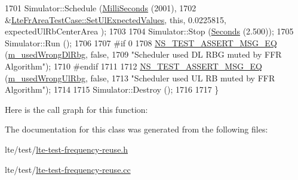 \begin{DoxyCode}
1701   Simulator::Schedule (\hyperlink{group__timecivil_gaf26127cf4571146b83a92ee18679c7a9}{MilliSeconds} (2001),
1702                        &\hyperlink{classLteFrAreaTestCase_aac2718dc3703d2ad389f88ffa20d035e}{LteFrAreaTestCase::SetUlExpectedValues}, \textcolor{keyword}{this},
       0.0225815, expectedUlRbCenterArea );
1703 
1704   Simulator::Stop (\hyperlink{group__timecivil_ga33c34b816f8ff6628e33d5c8e9713b9e}{Seconds} (2.500));
1705   Simulator::Run ();
1706 
1707 \textcolor{preprocessor}{#if 0}
1708   \hyperlink{group__testing_ga2a9d78cffb3db8e867c35fff0b698cf5}{NS\_TEST\_ASSERT\_MSG\_EQ} (\hyperlink{classLteFrAreaTestCase_acf1b825c0fc50c57ac990d11ea1529c0}{m\_usedWrongDlRbg}, \textcolor{keyword}{false},
1709                          \textcolor{stringliteral}{"Scheduler used DL RBG muted by FFR Algorithm"});
1710 \textcolor{preprocessor}{#endif}
1711 
1712   \hyperlink{group__testing_ga2a9d78cffb3db8e867c35fff0b698cf5}{NS\_TEST\_ASSERT\_MSG\_EQ} (\hyperlink{classLteFrAreaTestCase_a11e401119f17b78d6693ef29f82b8895}{m\_usedWrongUlRbg}, \textcolor{keyword}{false},
1713                          \textcolor{stringliteral}{"Scheduler used UL RB muted by FFR Algorithm"});
1714 
1715   Simulator::Destroy ();
1716 
1717 \}
\end{DoxyCode}


Here is the call graph for this function\+:




The documentation for this class was generated from the following files\+:\begin{DoxyCompactItemize}
\item 
lte/test/\hyperlink{lte-test-frequency-reuse_8h}{lte-\/test-\/frequency-\/reuse.\+h}\item 
lte/test/\hyperlink{lte-test-frequency-reuse_8cc}{lte-\/test-\/frequency-\/reuse.\+cc}\end{DoxyCompactItemize}
